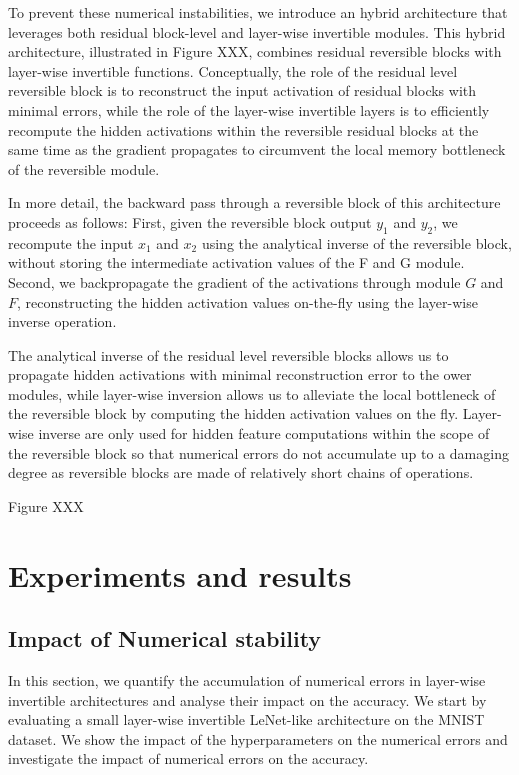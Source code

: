 \documentclass[twocolumn]{bmcart}
\begin{document}
To prevent these numerical instabilities, we introduce an hybrid architecture that leverages both residual block-level and layer-wise invertible modules.
This hybrid architecture, illustrated in Figure XXX, combines residual reversible blocks with layer-wise invertible functions. 
Conceptually, the role of the residual level reversible block is to reconstruct the input activation of residual blocks with minimal errors, while the role of the layer-wise invertible layers is to efficiently recompute the hidden activations within the reversible residual blocks at the same time as the gradient propagates to circumvent the local memory bottleneck of the reversible module.

In more detail, the backward pass through a reversible block of this architecture proceeds as follows: 
First, given the reversible block output $y_1$ and $y_2$, we recompute the input $x_1$ and $x_2$ using the analytical inverse of the reversible block, without storing the intermediate activation values of the F and G module.
Second, we backpropagate the gradient of the activations through module $G$ and $F$, reconstructing the hidden activation values on-the-fly using the layer-wise inverse operation.

The analytical inverse of the residual level reversible blocks allows us to propagate hidden activations with minimal reconstruction error to the ower modules, while layer-wise inversion allows us to alleviate the local bottleneck of the reversible block by computing the hidden activation values on the fly. Layer-wise inverse are only used for hidden feature computations within the scope of the reversible block so that numerical errors do not accumulate up to a damaging degree as reversible blocks are made of relatively short chains of operations.

Figure XXX 

\section{Experiments and results}

\subsection{Impact of Numerical stability}

In this section, we quantify the accumulation of numerical errors in layer-wise invertible architectures and analyse their impact on the accuracy.
We start by evaluating a small layer-wise invertible LeNet-like architecture on the MNIST dataset.
We show the impact of the hyperparameters on the numerical errors and investigate the impact of numerical errors on the accuracy.
\end{document}
